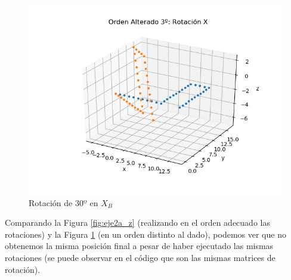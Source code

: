 \documentclass[12pt,a4paper]{report}
\begin{document}
\begin{figure}[H]
	\centering
	\includegraphics[width=0.7\linewidth]{img/eje2b_z.png}
	\caption{Rotación de $30º$ en $X_B$}
	\label{fig:eje2b_x}
\end{figure}

Comparando la Figura \ref{fig:eje2a_z} (realizando en el orden adecuado las rotaciones) y la Figura \ref{fig:eje2b_x} (en un orden distinto al dado), podemos ver que no obtenemos la misma posición final a pesar de haber ejecutado las mismas rotaciones (se puede observar en el código que son las mismas matrices de rotación).
\end{document}
